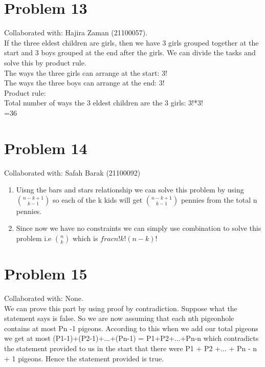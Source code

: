 \documentclass{article}
\begin{document}
\section{Problem 13}
Collaborated with: Hajira Zaman (21100057).\\
If the three eldest children are girls, then we have 3 girls grouped together at the start and 3 boys grouped at the end after the girls. We can divide the tasks and solve this by product rule. \\
The ways the three girls can arrange at the start: 3!\\
The ways the three boys can arrange at the end: 3!\\
Product rule: \\
Total number of ways the 3 eldest children are the 3 girls: 3!*3!\\
=36 \\

\section{Problem 14}
Collaborated with: Safah Barak (21100092)\\
\begin{enumerate}
\item %
Uisng the bars and stars relationship we can solve this problem by using ${n-k+1\choose k-1}$ so each of the k kids will get ${n-k+1\choose k-1}$ pennies from the total n pennies.\\
\item %
Since now we have no constraints we can simply use combination to solve this problem i.e ${n\choose k}$ which is $frac{n!}{k!(n-k)!}$ \\


\end{enumerate}

\section{Problem 15}
Collaborated with: None.\\
We can prove this part by using proof by contradiction. Suppose what the statement says is false. So we are now assuming that each nth pigeonhole contains at most Pn -1 pigeons. According to this when we add our total pigeons we get at most (P1-1)+(P2-1)+...+(Pn-1) = P1+P2+...+Pn-n which contradicts the statement provided to us in the start that there were P1 + P2 +... + Pn - n + 1 pigeons. Hence the statement provided is true.
\end{document}
